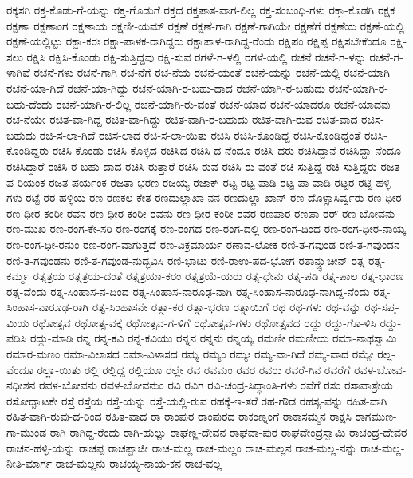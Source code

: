ರಕ್ಕಸಗಿ
ರಕ್ತ-ಕೊಡು-ಗೆ-ಯನ್ನು
ರಕ್ತ-ಗೊಡುಗೆ
ರಕ್ತದ
ರಕ್ತಪಾತ-ವಾಗ-ಲಿಲ್ಲ
ರಕ್ತ-ಸಂಬಂಧಿ-ಗಳು
ರಕ್ತಾ-ಕೊಡಗಿ
ರಕ್ಷಕ
ರಕ್ಷಣಾ
ರಕ್ಷಣಾಂಗ
ರಕ್ಷಣಾಯ
ರಕ್ಷಣೀ-ಯಮ್
ರಕ್ಷಣೆ
ರಕ್ಷಣೆ-ಗಾಗಿ
ರಕ್ಷಣೆ-ಗಾಗಿಯೇ
ರಕ್ಷಣೆಗೆ
ರಕ್ಷಣೆಯ
ರಕ್ಷಣೆ-ಯಲ್ಲಿ
ರಕ್ಷಣೆ-ಯಲ್ಲಿಟ್ಟು
ರಕ್ಷಾ-ಕರಃ
ರಕ್ಷಾ-ಪಾಳಕ-ರಾಗಿದ್ದರು
ರಕ್ಷಾಪಾಳ-ರಾಗಿದ್ದ-ರೆಂದು
ರಕ್ಷಿಪಂ
ರಕ್ಷಿಪ್ಪ
ರಕ್ಷಿಸಬೇಕೆಂದೂ
ರಕ್ಷಿ-ಸಲು
ರಕ್ಷಿಸಿ
ರಕ್ಷಿಸಿ-ಕೊಂಡು
ರಕ್ಷಿ-ಸುತ್ತಿದ್ದವು
ರಕ್ಷಿ-ಸುವ
ರಗಳೆ-ಗ-ಳಲ್ಲಿ
ರಗಳೆ-ಯಲ್ಲಿ
ರಚನೆ
ರಚನೆ-ಗ-ಳನ್ನು
ರಚನೆ-ಗ-ಳಾಗಿವೆ
ರಚನೆ-ಗಳು
ರಚನೆ-ಗಾಗಿ
ರಚ-ನೆಗೆ
ರಚ-ನೆಯ
ರಚನೆ-ಯಂತೆ
ರಚನೆ-ಯನ್ನು
ರಚನೆ-ಯಲ್ಲಿ
ರಚನೆ-ಯಾಗಿ
ರಚನೆ-ಯಾ-ಗಿದೆ
ರಚನೆ-ಯಾ-ಗಿದ್ದು
ರಚನೆ-ಯಾಗಿ-ರ-ಬಹು-ದಾದ
ರಚನೆ-ಯಾಗಿ-ರ-ಬಹುದು
ರಚನೆ-ಯಾಗಿ-ರ-ಬಹು-ದೆಂದು
ರಚನೆ-ಯಾಗಿ-ರ-ಲಿಲ್ಲ
ರಚನೆ-ಯಾಗಿ-ರು-ವಂತೆ
ರಚನೆ-ಯಾದ
ರಚನೆ-ಯಾದರೂ
ರಚನೆ-ಯಾದವು
ರಚ-ನೆಯೇ
ರಚಿತ-ವಾ-ಗಿದ್ದ
ರಚಿತ-ವಾ-ಗಿದ್ದು
ರಚಿತ-ವಾಗಿ-ರ-ಬಹುದು
ರಚಿತ-ವಾಗಿ-ರುವ
ರಚಿತ-ವಾದ
ರಚಿಸ-ಬಹುದು
ರಚಿ-ಸ-ಲಾ-ಗಿದೆ
ರಚಿಸ-ಲಾದ
ರಚಿ-ಸ-ಲಾ-ಯಿತು
ರಚಿಸಿ
ರಚಿಸಿ-ಕೊಂಡಿದ್ದ
ರಚಿಸಿ-ಕೊಂಡಿದ್ದಂತೆ
ರಚಿಸಿ-ಕೊಂಡಿದ್ದರು
ರಚಿಸಿ-ಕೊಂಡು
ರಚಿಸಿ-ಕೊಳ್ಳದ
ರಚಿಸಿದ
ರಚಿಸಿ-ದ-ನೆಂದೂ
ರಚಿಸಿ-ದರು
ರಚಿಸಿದ್ದಾನೆ
ರಚಿಸಿದ್ದಾ-ನೆಂದೂ
ರಚಿಸಿದ್ದಾರೆ
ರಚಿಸಿ-ರ-ಬಹು-ದಾದ
ರಚಿಸಿ-ರುತ್ತಾರೆ
ರಚಿಸಿ-ರುವ
ರಚಿಸಿ-ರು-ವಂತೆ
ರಚಿ-ಸುತ್ತಿದ್ದ
ರಚಿ-ಸುತ್ತಿದ್ದರು
ರಜತ-ಪ-ರಿಯಂಕ
ರಜತ-ಪರ್ಯಂಕ
ರಜತಾ-ಭರಣ
ರಜಯ್ಯ
ರಜಾಕ್
ರಟ್ಟ
ರಟ್ಟ-ಪಾಡಿ
ರಟ್ಟ-ಪಾ-ವಾಡಿ
ರಟ್ಟರ
ರಟ್ಟಿ-ಹಳ್ಳಿ-ಗಳು
ರಟ್ಟೆ
ರಠ-ಹಳ್ಳಿಯ
ರಣ
ರಣಕಲ-ಕೇತ
ರಣದುಲ್ಲಾಖಾ-ನನ
ರಣದುಲ್ಲಾ-ಖಾನ್
ರಣ-ದೊಳ್ಸಾಸಿರ್ವ್ವರು
ರಣ-ಧೀರ
ರಣ-ಧೀರ-ಕಂಠೀ-ರವನ
ರಣ-ಧೀರ-ಕಂಠೀ-ರವನು
ರಣ-ಧೀರ-ಕಂಠೀ-ರವರ
ರಣಪಾರ
ರಣಪಾ-ರರ್
ರಣ-ಬೋವನು
ರಣ-ಮುಖ
ರಣ-ರಂಗ-ಕೇ-ಸರಿ
ರಣ-ರಂಗಕ್ಕೆ
ರಣ-ರಂಗದ
ರಣ-ರಂಗ-ದಲ್ಲಿ
ರಣ-ರಂಗ-ದಿಂದ
ರಣ-ರಂಗ-ಧೀರ-ನಾಯ್ಕ
ರಣ-ರಂಗ-ಧೀ-ರನುಂ
ರಣ-ರಂಗ-ವಾಗುತ್ತದೆ
ರಣ-ವಿಕ್ರಮಾರ್ಯ
ರಣಾವ-ಲೋಕ
ರಣಿ-ತ-ಗವುಂಡ
ರಣಿ-ತ-ಗವುಂಡನ
ರಣಿ-ತ-ಗವುಂಡನು
ರಣಿ-ತ-ಗವುಂಡ-ನುದ್ಭವಿಸಿ
ರಣಿ-ಭಾಟು
ರಣಿ-ರಾಉ-ಪದ-ಭೋಗ
ರತಾನ್ಚ್ಛುಚೀನ್
ರತ್ನ
ರತ್ನ-ಕರ್ಮ್ಮ
ರತ್ನತ್ರಯ
ರತ್ನತ್ರಯ-ದಂತೆ
ರತ್ನತ್ರಯಾ-ಕರಂ
ರತ್ನತ್ರಯೆ-ಯರು
ರತ್ನ-ಧೇನು
ರತ್ನ-ಪಡಿ
ರತ್ನ-ಪಾಲ
ರತ್ನ-ಭಾರಣ
ರತ್ನ-ವೆಂದು
ರತ್ನ-ಸಿಂಹಾಸ-ನ-ದಿಂದ
ರತ್ನ-ಸಿಂಹಾಸ-ನಾರೂಢ-ನಾಗಿ
ರತ್ನ-ಸಿಂಹಾಸ-ನಾರೂಢ-ನಾಗಿದ್ದ-ನೆಂದು
ರತ್ನ-ಸಿಂಹಾಸ-ನಾರೂಢ-ರಾಗಿ
ರತ್ನ-ಸಿಂಹಾಸನೇ
ರತ್ನಾ-ಕರ
ರತ್ನಾ-ಭರಣ
ರತ್ನಾಯಿಗೆ
ರಥ
ರಥ-ಗಳು
ರಥ-ವನ್ನು
ರಥ-ಸಪ್ತ-ಮಿಯ
ರಥೋತ್ಸವ
ರಥೋತ್ಸ-ವಕ್ಕೆ
ರಥೋತ್ಸವ-ಗ-ಳಿಗೆ
ರಥೋತ್ಸವ-ಗಳು
ರಥೋತ್ಸವದ
ರದ್ದು
ರದ್ದು-ಗೊ-ಳಿಸಿ
ರದ್ದು-ಪಡಿಸಿ
ರದ್ದು-ಮಾಡಿ
ರನ್ನ
ರನ್ನ-ಕವಿ
ರನ್ನ-ಕವಿಯು
ರನ್ನನ
ರನ್ನನು
ರನ್ನಯ್ಯ
ರಮಣೀ
ರಮಣೀಯ
ರಮಾ-ನಾಥಸ್ವಾಮಿ
ರಮಾರ-ಮಣಂ
ರಮಾ-ವಿಲಾಸದ
ರಮಾ-ವಿಳಾಸದ
ರಮ್ಯ
ರಮ್ಯಂ
ರಮ್ಯಃ
ರಮ್ಯ-ವಾ-ಗಿದೆ
ರಮ್ಯ-ವಾದ
ರಮ್ಯೇ
ರಲ್ಲ-ವೆಂದೂ
ರಲ್ಲಾ-ಯಿತು
ರಲ್ಲಿ
ರಲ್ಲಿದ್ದ
ರಲ್ಲಿಯೂ
ರಲ್ಲೇ
ರವ
ರವಮಂ
ರವರ
ರವರು
ರವರೆ-ಗಿನ
ರವರೆಗೆ
ರವಳ-ಬೋವ-ನಧೀಶನ
ರವಳ-ಬೋವನು
ರವಳ-ಬೋವನುಂ
ರವಿ
ರವಿಗ
ರವಿ-ಚಂದ್ರ-ಸಿದ್ಧಾಂತಿ-ಗಳು
ರವೆಗೆ
ರಸಂ
ರಸಾವಾತ್ರೇಯ
ರಸೋದ್ಘಾಟಕೇ
ರಸ್ತೆ
ರಸ್ತೆಯ
ರಸ್ತೆ-ಯನ್ನು
ರಸ್ತೆ-ಯಲ್ಲಿ-ರುವ
ರಹಕ್ಕೆ-ಇ-ತರೆ
ರಹ-ಗೌಡ
ರಹಸ್ಯ-ವನ್ನು
ರಹಿತ-ವಾಗಿ
ರಹಿತ-ವಾಗಿ-ರುವು-ದ-ರಿಂದ
ರಹಿತ-ವಾದ
ರಾ
ರಾಂಪುರ
ರಾಂಪುರದ
ರಾಕಂಣ್ನಂಗೆ
ರಾಕಾಸಮ್ಮನ
ರಾಕ್ಷಸಿ
ರಾಗಮುಣ-ಗಾ-ಮುಂಡ
ರಾಗಿ
ರಾಗಿದ್ದ-ರೆಂದು
ರಾಗಿ-ಹುಲ್ಲು
ರಾಘಣ್ಣ-ದೇವನ
ರಾಘವಾ-ಪುರ
ರಾಘವೇಂದ್ರಸ್ವಾಮಿ
ರಾಚಂದ್ರ-ದೇವರ
ರಾಚನ-ಹಳ್ಳಿ-ಯನ್ನು
ರಾಚಪ್ಪ
ರಾಚಪ್ಪಾಜೀ
ರಾಚ-ಮಲ್ಲ
ರಾಚ-ಮಲ್ಲಂ
ರಾಚ-ಮಲ್ಲನ
ರಾಚ-ಮಲ್ಲ-ನನ್ನು
ರಾಚ-ಮಲ್ಲ-ನೀತಿ-ಮಾರ್ಗ
ರಾಚ-ಮಲ್ಲನು
ರಾಚಯ್ಯ-ನಾಯ-ಕನ
ರಾಚ-ವಲ್ಲ
